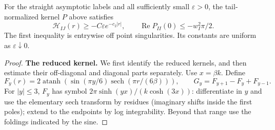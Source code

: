 \begin{lemma}\label{lem:07_magnetic_analysis-positive}
For the straight asymptotic labels and all sufficiently small
\(\varepsilon>0\), the tail-normalized kernel \(P\) above satisfies
\begin{equation}
 \mathcal H_{IJ}(r)\ge-C\varepsilon e^{-c_2|r|},\qquad
 \operatorname{Re}P_{II}(0)\le-w_I^2\pi/2.
 \label{eq:M-28}
\end{equation}
The first inequality is entrywise off point singularities. Its constants
are uniform as \(\varepsilon\downarrow0\).
\end{lemma}
\begin{proof}
\par\smallskip\noindent\textbf{The reduced kernel.}
We first identify the reduced kernels, and then estimate their off-diagonal and diagonal parts separately. Use \(x=\beta k\). Define
\[
 F_y(r)=2\operatorname{atanh}(\sin(\pi y/6)\operatorname{sech}(\pi r/(6\beta))),
 \qquad G_y=F_{y+1}-F_y+F_{y-1}.
\]
For \(|y|\le3\), \(F_y\) has symbol \(2\pi\sinh(yx)/(k\cosh(3x))\): differentiate in \(y\) and use the elementary sech transform by residues (imaginary shifts inside the first poles); extend to the endpoints by log integrability. Beyond that range use the foldings indicated by the sine.


\end{proof}
